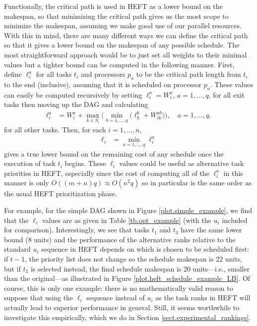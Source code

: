 \documentclass[12pt]{article}
\begin{document}
Functionally, the critical path is used in HEFT as a lower bound on the makespan, so that minimizing the critical path gives us the most scope to minimize the makespan, assuming we make good use of our parallel resources. With this in mind, there are many different ways we can define the critical path so that it gives a lower bound on the makespan of any possible schedule. The most straightforward approach would be to just set all weights to their minimal values but a tighter bound can be computed in the following manner. First, define $\ell_i^a$ for all tasks $t_i$ and processors $p_a$ to be the critical path length from $t_i$ to the end (inclusive), assuming that it is scheduled on processor $p_a$. These values can easily be computed recursively by setting $\ell_i^a = W_i^a$, $a = 1, \dots, q$, for all exit tasks then moving up the DAG and calculating 
\begin{align}
\ell_i^a &= W_i^a + \max_{k \in S_i} \bigg( \min_{b = 1, \dots, q} \big( \ell_k^b + W_{ik}^{ab} \big)  \bigg), \quad a = 1, \dots, q, \label{eq.opt_uia} 
\end{align}
for all other tasks. Then, for each $i = 1, \dots, n$,
\begin{align}
\ell_i &= \min_{a = 1, \dots, q}\ell_i^a \label{eq.opt_ui} 
\end{align}
gives a true lower bound on the remaining cost of any schedule once the execution of task $t_i$ begins. These $\ell_i$ values could be useful as alternative task priorities in HEFT, especially since the cost of computing all of the $\ell_i^a$ in this manner is only $O((m + n)q) \approx O(n^2q)$ so in particular is the same order as the usual HEFT prioritization phase. 

For example, for the simple DAG shown in Figure \ref{plot.simple_example}, we find that the $\ell_i$ values are as given in Table \ref{tb.opt_example} (with the $u_i$ included for comparison). Interestingly, we see that tasks $t_1$ and $t_3$ have the same lower bound (8 units) and the performance of the alternative ranks relative to the standard $u_i$ sequence in HEFT depends on which is chosen to be scheduled first: if $t-1$, the priority list does not change so the schedule makespan is 22 units, but if $t_3$ is selected instead, the final schedule makespan is 20 units---i.e., smaller than the original---as illustrated in Figure \ref{plot.heft_schedule_example_LB}. Of course, this is only one example: there is no mathematically valid reason to suppose that using the $\ell_i$ sequence instead of $u_i$ as the task ranks in HEFT will actually lead to superior performance in general. Still, it seems worthwhile to investigate this empirically, which we do in Section \ref{sect.experimental_rankings}.
\end{document}
